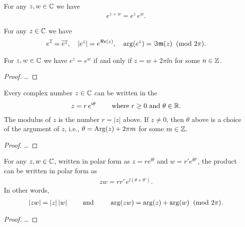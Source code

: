 \begin{lemma}
  \label{lem:complex_exp_properties}
  For any $z,w \in \mathbb{C}$ we have
  \begin{align*}
    e^{z + w} = e^z \, e^w.
  \end{align*}

  For any $z \in \mathbb{C}$ we have
  \begin{align*}
    e^{\overline{z}} = \overline{e^z}, \quad
    |e^z| = e^{\Re\mathfrak{e}(z)}, \quad
    \arg(e^z) = \Im\mathfrak{m}(z) \;\;(\mathrm{mod}~2\pi) .
  \end{align*}

  For $z,w \in \mathbb{C}$ we have
  $e^{z} = e^{w}$ if and only if $z = w + 2 \pi \ii n$ for some $n \in \mathbb{Z}$.
\end{lemma}
\begin{proof}
  \ldots
\end{proof}

\begin{lemma}
  \label{lem:polar_form}
  Every complex number $z \in \mathbb{C}$ can be written in the 
  \begin{align*}
    z = r \, e^{\mathfrak{i} \theta}
    \qquad \text{ where $r \ge 0$ and $\theta \in \mathbb{R}$.}
  \end{align*}
  The modulus of $z$ is the number $r = |z|$ above.
  If $z \ne 0$, then $\theta$ above is a choice of the argument of $z$,
  i.e., $\theta = \mathrm{Arg}(z) + 2 \pi m$ for some $m \in \mathbb{Z}$.
\end{lemma}
\begin{proof}
  \ldots
\end{proof}

\begin{lemma}
  \label{lem:multiplication_polar}
  For any $z,w \in \mathbb{C}$, written in polar form as
  $z = r e^{\ii \theta}$ and $w = r' e^{\ii \theta'}$, the product
  can be written in polar form as
  \begin{align*}
    z w = r r' \, e^{\ii (\theta + \theta')} .
  \end{align*}
  In other words,
  \begin{align*}
    |z w| = |z| \, |w|
    \qquad \text{ and } \qquad
    \arg(z w) = \arg(z) + \arg(w) \;\;(\mathrm{mod}~2\pi).
  \end{align*}
\end{lemma}
\begin{proof}
  \ldots
\end{proof}


